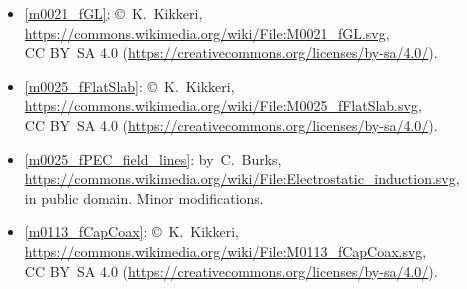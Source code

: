 \begin{itemize}
\item[Fig.] \label{m0021_fGL_Credit}
  \ref{m0021_fGL}:
  \copyright~K.\ Kikkeri, 
  \url{https://commons.wikimedia.org/wiki/File:M0021_fGL.svg},\\ 
  CC BY~SA 4.0 (\url{https://creativecommons.org/licenses/by-sa/4.0/}).

\item[Fig.] \label{m0025_fFlatSlab_Credit}
  \ref{m0025_fFlatSlab}:
  \copyright~K.\ Kikkeri, 
  \url{https://commons.wikimedia.org/wiki/File:M0025_fFlatSlab.svg},\\ 
  CC BY~SA 4.0 (\url{https://creativecommons.org/licenses/by-sa/4.0/}).

\item[Fig.] \label{m0025_fPEC_field_lines_Credit}
  \ref{m0025_fPEC_field_lines}:
  by~C.\ Burks, 
  \url{https://commons.wikimedia.org/wiki/File:Electrostatic_induction.svg},\\ 
  in public domain. 
  Minor modifications.


\item[Fig.] \label{m0113_fCapCoax_Credit}
  \ref{m0113_fCapCoax}:
  \copyright~K.\ Kikkeri, 
  \url{https://commons.wikimedia.org/wiki/File:M0113_fCapCoax.svg},\\ 
  CC BY~SA 4.0 (\url{https://creativecommons.org/licenses/by-sa/4.0/}).

\end{itemize}

\twocolumn
